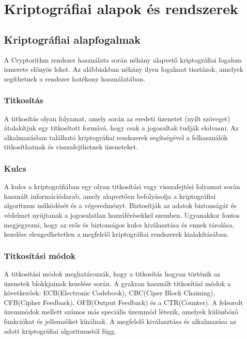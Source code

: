 \chapter{Kriptográfiai alapok és rendszerek}


\section{Kriptográfiai alapfogalmak}
A Cryptorithm rendszer használata során néhány alapvető kriptográfiai fogalom ismerete előnyös lehet. Az alábbiakban néhány ilyen fogalmat tisztázok, amelyek segíthetnek a rendszer hatékony használatában.
\subsection{Titkosítás}
A titkosítás olyan folyamat, amely során az eredeti üzenetet (nyílt szöveget) átalakítjuk egy titkosított formává, hogy csak a jogosultak tudják elolvasni. Az alkalmazásban található kriptográfiai rendszerek segítségével a felhasználók titkosíthatnak és visszafejthetnek üzeneteket.

\subsection{Kulcs}
A kulcs a kriptográfiában egy olyan titkosítási vagy visszafejtési folyamat során használt információdarab, amely alapvetően befolyásolja a kriptográfiai algoritmus működését és a végeredményt. Biztosítják az adatok biztonságát és védelmet nyújtanak a jogosulatlan hozzáférésekkel szemben. Ugyanakkor fontos megjegyezni, hogy az erős és biztonságos kulcs kiválasztása és ennek tárolása, kezelése elengedhetetlen a megfelelő kriptográfiai rendszerek kialakításában.

\newpage
\subsection{Titkosítási módok}
A titkosítási módok meghatározzák, hogy a titkosítás hogyan történik az üzenetek blokkjainak kezelése során. A gyakran használt titkosításí módok a következőek: ECB(Electronic Codebook), CBC(Ciper Block Chaining), CFB(Cipher Feedback), OFB(Output Feedback) és a CTR(Counter).
A felsorolt üzemmódok mellett számos más speciális üzemmód létezik, amelyek különböző funkciókat és jellemzőket kínálnak. A megfelelő kiválasztása és alkalmazása az adott kriptográfiai algoritmustól függ.

